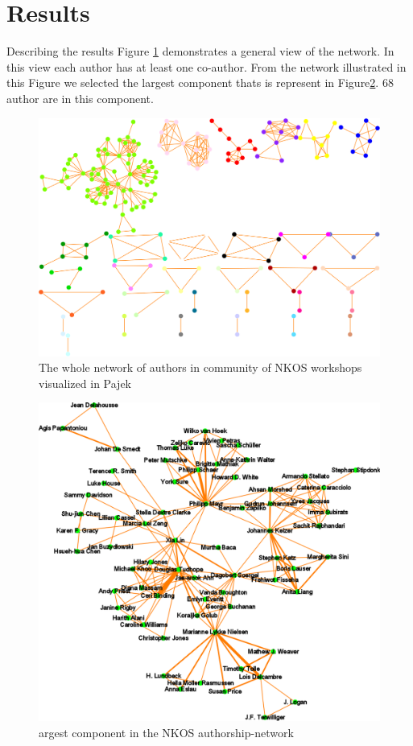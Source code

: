 \documentclass[runningheads,a4paper]{llncs}
\begin{document}
\section{Results}\label{results}
Describing the results %
Figure \ref{fig:wholenet} demonstrates a general view of the network. In this view each author has at least one co-author. From the network illustrated in this Figure we selected the largest component thats is represent in Figure\ref{fig:largestComponent}. 68 author are in this component.
\begin{figure}
	\centering
	\includegraphics[width=1.0\linewidth]{wholeNet}
	\caption{The whole network of authors in community of NKOS workshops visualized in Pajek}
	\label{fig:wholenet}
\end{figure}
\begin{figure}
	\centering
	\includegraphics[width=1\linewidth]{largestComponent}
	\caption{argest component in the NKOS authorship-network}
	\label{fig:largestComponent}
\end{figure}
\end{document}
